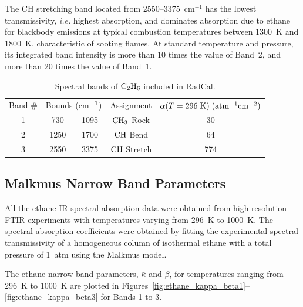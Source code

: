 The CH stretching band located from 2550--3375~cm$^{-1}$ has the lowest transmissivity, \textit{i.e.} highest absorption, and dominates absorption due to ethane for blackbody emissions at typical combustion temperatures between 1300~K and 1800~K, characteristic of sooting flames. At standard temperature and pressure, its integrated band intensity is more than 10 times the value of Band~2, and more than 20 times the value of Band~1.

\begin{table} [ht]
    \centering
    \caption{Spectral bands of $\rm C_2H_6$ included in RadCal.}
    \vspace{0.1in}
    \label{Table::C2H6}
    \begin{tabular}{|c|c|c|c|c|}
      \hline
      Band \# & \multicolumn{2}{|l|}{Bounds (cm$\rm ^{-1}$) } & Assignment & $\alpha(T=296 \; {\rm K}) \; (\rm {atm^{-1} cm^{-2}})$\\
      \cline{1-5}
      1 & 730  & 1095 &  $\rm CH_3$ Rock   &  30  \\
      2 & 1250 & 1700 &  $\rm CH$  Bend    &  64  \\
      3 & 2550 & 3375 &  $\rm CH$  Stretch &  774 \\
      \hline
    \end{tabular}
\end{table}

\subsection{Malkmus Narrow Band Parameters}

All the ethane IR spectral absorption data were obtained from high resolution FTIR experiments with temperatures varying from 296~K to 1000~K. The spectral absorption coefficients were obtained by fitting the experimental spectral transmissivity of a homogeneous column of isothermal ethane with a total pressure of 1~atm using the Malkmus model.

The ethane narrow band parameters, $\bar{\kappa}$ and $\beta$, for temperatures ranging from 296~K to 1000~K are plotted in Figures~\ref{fig:ethane_kappa_beta1}--\ref{fig:ethane_kappa_beta3} for Bands 1 to 3.

\newpage

